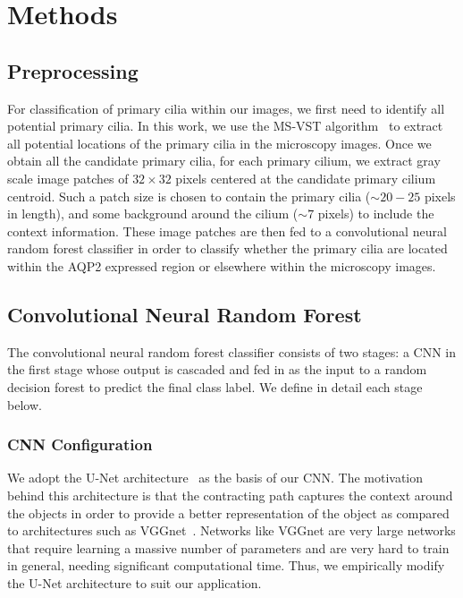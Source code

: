 \section{Methods}

\subsection{Preprocessing}

For classification of primary cilia within our images, we first need to identify all potential primary cilia. In this work, we use the MS-VST algorithm~\cite{bozhang_Wavelets_2008} to extract all potential locations of the primary cilia in the microscopy images. Once we obtain all the candidate primary cilia, for each primary cilium, we extract gray scale image patches of $32 \times 32$ pixels centered at the candidate primary cilium centroid. Such a patch size is chosen to contain the primary cilia ($\sim20-25$ pixels in length), and some background around the cilium ($\sim7$ pixels) to include the context information. These image patches are then fed to a convolutional neural random forest classifier in order to classify whether the primary cilia are located within the AQP2 expressed region or elsewhere within the microscopy images.

\subsection{Convolutional Neural Random Forest}

The convolutional neural random forest classifier consists of two stages: a CNN in the first stage whose output is cascaded and fed in as the input to a random decision forest to predict the final class label. We define in detail each stage below.

\subsubsection{\textbf{CNN Configuration}}

We adopt the U-Net architecture~\cite{ronneberger_UNet_2015} as the basis of our CNN\@. The motivation behind this architecture is that the contracting path captures the context around the objects in order to provide a better representation of the object as compared to architectures such as VGGnet~\cite{simonyan_Very_2014}. Networks like VGGnet are very large networks that require learning a massive number of parameters and are very hard to train in general, needing significant computational time. Thus, we empirically modify the U-Net architecture to suit our application.


